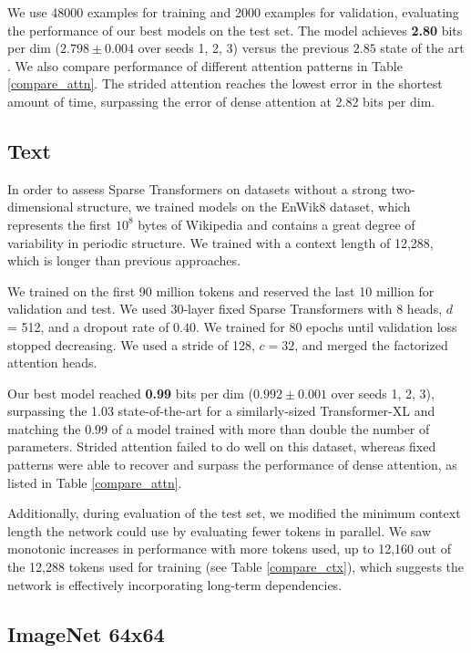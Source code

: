 We use 48000 examples for training and 2000 examples for validation, evaluating the performance of our best models on the test set. The model achieves \textbf{2.80} bits per dim ($2.798 \pm 0.004$ over seeds 1, 2, 3) versus the previous $2.85$ state of the art \cite{chen2017pixelsnail}. We also compare performance of different attention patterns in Table \ref{compare_attn}. The strided attention reaches the lowest error in the shortest amount of time, surpassing the error of dense attention at 2.82 bits per dim.

\subsection{Text}
In order to assess Sparse Transformers on datasets without a strong two-dimensional structure, we trained models on the EnWik8 dataset, which represents the first $10^{8}$ bytes of Wikipedia and contains a great degree of variability in periodic structure. We trained with a context length of 12,288, which is longer than previous approaches.

We trained on the first 90 million tokens and reserved the last 10 million for validation and test. We used 30-layer fixed Sparse Transformers with 8 heads, $d$ = 512, and a dropout rate of $0.40$. We trained for 80 epochs until validation loss stopped decreasing. We used a stride of 128, $c = 32$, and merged the factorized attention heads.

Our best model reached \textbf{0.99} bits per dim ($0.992 \pm 0.001$ over seeds 1, 2, 3), surpassing the 1.03 state-of-the-art for a similarly-sized Transformer-XL  \cite{dai2018transformer} and matching the 0.99 of a model trained with more than double the number of parameters. Strided attention failed to do well on this dataset, whereas fixed patterns were able to recover and surpass the performance of dense attention, as listed in Table \ref{compare_attn}.

Additionally, during evaluation of the test set, we modified the minimum context length the network could use by evaluating fewer tokens in parallel. We saw monotonic increases in performance with more tokens used, up to 12,160 out of the 12,288 tokens used for training (see Table \ref{compare_ctx}), which suggests the network is effectively incorporating long-term dependencies.

\subsection{ImageNet 64x64}

